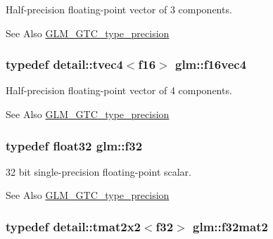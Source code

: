 Half-\/precision floating-\/point vector of 3 components. 

\begin{DoxySeeAlso}{See Also}
\hyperlink{group__gtc__type__precision}{G\-L\-M\-\_\-\-G\-T\-C\-\_\-type\-\_\-precision} 
\end{DoxySeeAlso}
\hypertarget{group__gtc__type__precision_gabf914b5cb8fad08b5897f53e7560a2de}{
\subsubsection[{f16vec4}]{\setlength{\rightskip}{0pt plus 5cm}typedef detail\-::tvec4$<$f16$>$ {\bf glm\-::f16vec4}}}\label{group__gtc__type__precision_gabf914b5cb8fad08b5897f53e7560a2de}


Half-\/precision floating-\/point vector of 4 components. 

\begin{DoxySeeAlso}{See Also}
\hyperlink{group__gtc__type__precision}{G\-L\-M\-\_\-\-G\-T\-C\-\_\-type\-\_\-precision} 
\end{DoxySeeAlso}
\hypertarget{group__gtc__type__precision_ga0ec999b57f5330d9021256e96038df04}{
\subsubsection[{f32}]{\setlength{\rightskip}{0pt plus 5cm}typedef float32 {\bf glm\-::f32}}}\label{group__gtc__type__precision_ga0ec999b57f5330d9021256e96038df04}


32 bit single-\/precision floating-\/point scalar. 

\begin{DoxySeeAlso}{See Also}
\hyperlink{group__gtc__type__precision}{G\-L\-M\-\_\-\-G\-T\-C\-\_\-type\-\_\-precision} 
\end{DoxySeeAlso}
\hypertarget{group__gtc__type__precision_ga82ecea513745584fb481d18fc9fa5e0a}{
\subsubsection[{f32mat2}]{\setlength{\rightskip}{0pt plus 5cm}typedef detail\-::tmat2x2$<$f32$>$ {\bf glm\-::f32mat2}}}\label{group__gtc__type__precision_ga82ecea513745584fb481d18fc9fa5e0a}


